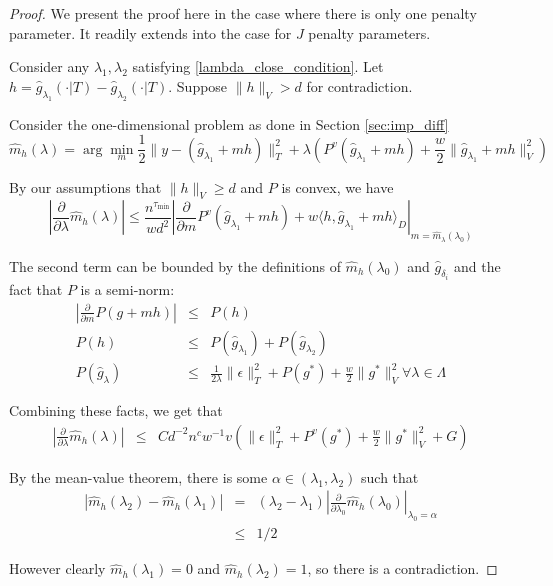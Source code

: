 \documentclass[12pt]{article}
\begin{document}
\begin{proof}
We present the proof here in the case where there is only one penalty parameter. It readily extends into the case for $J$ penalty parameters.

Consider any $\lambda_1, \lambda_2$ satisfying \eqref{lambda_close_condition}. Let $h=\hat{g}_{\lambda_1}(\cdot|T)-\hat{g}_{\lambda_2}(\cdot|T)$.
Suppose $\|h\|_{V}>d$ for contradiction.

Consider the one-dimensional problem as done in Section \ref{sec:imp_diff}
\[
\hat{m}_{h}(\lambda)=\arg\min_{m}\frac{1}{2}\|y-(\hat{g}_{\lambda_1}+mh)\|_{T}^{2}+\lambda \left(P^{v}(\hat{g}_{\lambda_1}+mh)+\frac{w}{2}\|\hat{g}_{\lambda_1}+mh\|_{V}^{2}\right)
\]

By our assumptions that $\|h\|_V \ge d$ and $P$ is convex, we have
\begin{equation}
\left | \frac{\partial}{\partial\lambda}\hat{m}_{h}(\lambda) \right | \le 
\frac{n^{\tau_{\min}}}{wd^{2}}
\left | \frac{\partial}{\partial m}P^{v}(\hat{g}_{\lambda_1}+mh)+w\langle h,\hat{g}_{\lambda_1}+mh\rangle_{D}
\right |_{m=\hat{m}_{\lambda}(\lambda_{0})}
\end{equation}

The second term can be bounded by the definitions of $\hat{m}_{h}(\lambda_{0})$ and $\hat{g}_{\delta_i}$ and the fact that $P$ is a semi-norm:
\begin{eqnarray*}
\left | \frac{\partial}{\partial m} P(g+mh) \right | & \le & P(h)\\
P(h) &\le & P(\hat{g}_{\lambda_1}) + P(\hat{g}_{\lambda_2})\\
P(\hat{g}_{\lambda}) & \le & \frac{1}{2 \lambda} \| \epsilon \|_T^2 + P(g^*) + \frac{w}{2} \| g^* \|_V^2 \forall \lambda \in \Lambda
\end{eqnarray*}

Combining these facts, we get that
\begin{eqnarray*}
\left|\frac{\partial}{\partial\lambda}\hat{m}_{h}(\lambda)\right| & \le & Cd^{-2}n^{c}w^{-1}v\left(\|\epsilon\|_{T}^{2}+P^{v}(g^{*})+\frac{w}{2}\|g^{*}\|_V^{2}+G\right)
\end{eqnarray*}

By the mean-value theorem, there is some $\alpha\in(\lambda_1,\lambda_2)$ such that 
\begin{eqnarray}
| \hat{m}_{h}(\lambda_2) - \hat{m}_{h}(\lambda_1) | &=& (\lambda_2-\lambda_1)\left|\frac{\partial}{\partial\lambda_{0}}\hat{m}_{h}(\lambda_{0})\right|_{\lambda_{0}=\alpha} \\
&\le& 1/2
\end{eqnarray}

However clearly $\hat{m}_{h}(\lambda_1)=0$ and $\hat{m}_{h}(\lambda_2)=1$, so there is a contradiction.
\end{proof}
\end{document}
